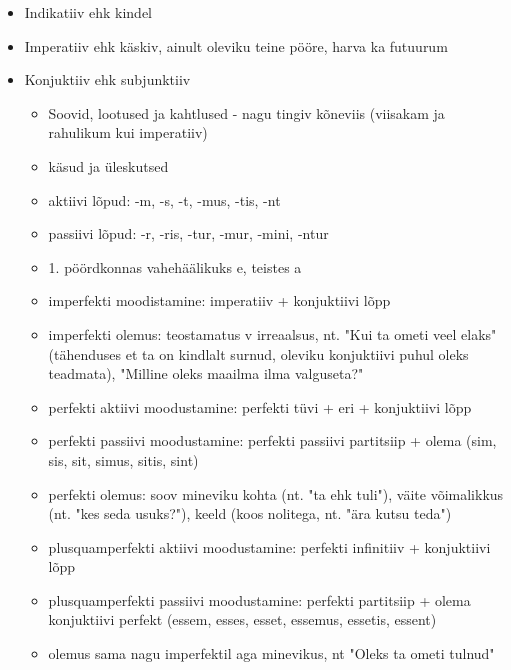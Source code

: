 \documentclass[12pt]{article}
\begin{document}
\begin{itemize}
\item Indikatiiv ehk kindel
\item Imperatiiv ehk käskiv, ainult oleviku teine pööre, harva ka futuurum
\item Konjuktiiv ehk subjunktiiv
\begin{itemize}
\item Soovid, lootused ja kahtlused - nagu tingiv kõneviis (viisakam ja rahulikum kui imperatiiv)
\item käsud ja üleskutsed
\item aktiivi lõpud: -m, -s, -t, -mus, -tis, -nt
\item passiivi lõpud: -r, -ris, -tur, -mur, -mini, -ntur
\item 1. pöördkonnas vahehäälikuks e, teistes a
\item imperfekti moodistamine: imperatiiv + konjuktiivi lõpp 
\item imperfekti olemus: teostamatus v irreaalsus, nt. "Kui ta ometi veel elaks" (tähenduses et ta on kindlalt surnud, oleviku konjuktiivi puhul oleks teadmata), "Milline oleks maailma ilma valguseta?"
\item perfekti aktiivi moodustamine: perfekti tüvi + eri + konjuktiivi lõpp
\item perfekti passiivi moodustamine: perfekti passiivi partitsiip + olema (sim, sis, sit, simus, sitis, sint)
\item perfekti olemus: soov mineviku kohta (nt. "ta ehk tuli"), väite võimalikkus (nt. "kes seda usuks?"), keeld (koos nolitega, nt. "ära kutsu teda")
\item plusquamperfekti aktiivi moodustamine: perfekti infinitiiv + konjuktiivi lõpp
\item plusquamperfekti passiivi moodustamine: perfekti partitsiip + olema konjuktiivi perfekt (essem, esses, esset, essemus, essetis, essent)
\item olemus sama nagu imperfektil aga minevikus, nt "Oleks ta ometi tulnud"
\end{itemize}
\end{itemize}
\end{document}
